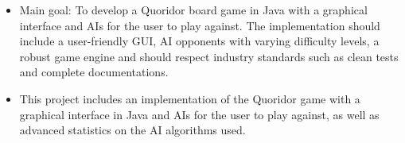 \documentclass[a4paper,10pt]{article}
\begin{document}
\begin{itemize}
    \item Main goal: To develop a Quoridor board game in Java with a graphical interface and AIs for the user to play against. The implementation should include a user-friendly GUI, AI opponents with varying difficulty levels, a robust game engine and should respect industry standards such as clean tests and complete documentations.
    \item This project includes an implementation of the Quoridor game with a graphical interface in Java and AIs for the user to play against, as well as advanced statistics on the AI algorithms used.
\end{itemize}
\end{document}
